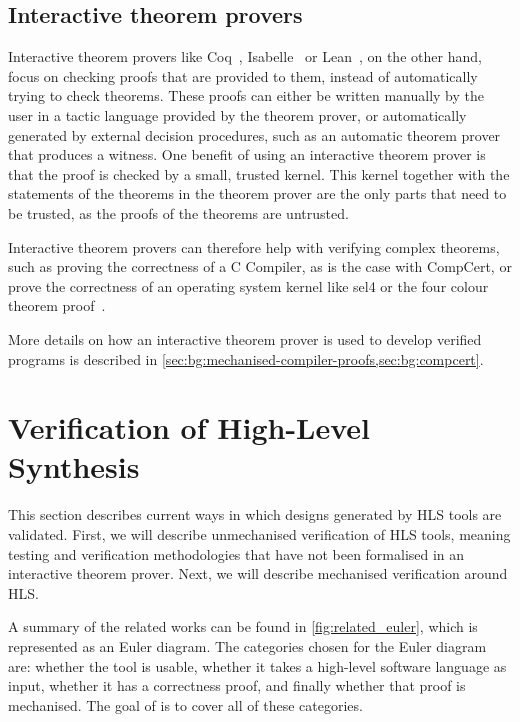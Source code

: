 \subsection{Interactive theorem provers}%
\label{sec:bg:interactive-theorem-provers}

Interactive theorem provers like
Coq~\cite[]{bertot04_inter_theor_provin_progr_devel},
Isabelle~\cite[]{paulson94_i} or Lean~\cite[]{moura15_l}, on the other hand,
focus on checking proofs that are provided to them, instead of automatically
trying to check theorems.  These proofs can either be written manually by the
user in a tactic language provided by the theorem prover, or automatically
generated by external decision procedures, such as an automatic theorem prover
that produces a witness.  One benefit of using an interactive theorem prover is
that the proof is checked by a small, trusted kernel.  This kernel together with
the statements of the theorems in the theorem prover are the only parts that
need to be trusted, as the proofs of the theorems are untrusted.

Interactive theorem provers can therefore help with verifying complex theorems,
such as proving the correctness of a C Compiler, as is the case with CompCert,
or prove the correctness of an operating system kernel like sel4 or the four
colour theorem proof~\cite[]{gonthier08_fp}.

More details on how an interactive theorem prover is used to develop verified
programs is described in
\cref{sec:bg:mechanised-compiler-proofs,sec:bg:compcert}.


\section{Verification of High-Level Synthesis}

This section describes current ways in which designs generated by \gls{HLS}
tools are validated.  First, we will describe unmechanised verification of
\gls{HLS} tools, meaning testing and verification methodologies that have not
been formalised in an interactive theorem prover.  Next, we will describe
mechanised verification around \gls{HLS}.

A summary of the related works can be found in \cref{fig:related_euler}, which
is represented as an Euler diagram.  The categories chosen for the Euler diagram
are: whether the tool is usable, whether it takes a high-level software language
as input, whether it has a correctness proof, and finally whether that proof is
mechanised.  The goal of \vericert{} is to cover all of these categories.

